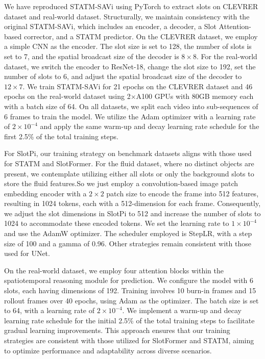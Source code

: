 \documentclass[sigconf]{acmart}
\begin{document}
We have reproduced STATM-SAVi using PyTorch to extract slots on CLEVRER dataset and real-world dataset. Structurally, we maintain consistency with the original STATM-SAVi, which includes an encoder, a decoder, a Slot Attention-based corrector, and a STATM predictor. On the CLEVRER dataset, we employ a simple CNN as the encoder. The slot size is set to 128, the number of slots is set to 7, and the spatial broadcast size of the decoder is $8\times8$. For the real-world dataset, we switch the encoder to ResNet-18, change the slot size to 192, set the number of slots to 6, and adjust the spatial broadcast size of the decoder to $12\times7$. We train STATM-SAVi for 21 epochs on the CLEVRER dataset and 46 epochs on the real-world dataset using 2$\times$A100 GPUs with 80GB memory each with a batch size of 64. On all datasets, we split each video into sub-sequences of 6 frames to train the model. We utilize the Adam optimizer with a learning rate of $2\times 10^{-4}$ and apply the same warm-up and decay learning rate schedule for the first 2.5\% of the total training steps.

For SlotPi, our training strategy on benchmark datasets aligns with those used for STATM and SlotFormer. For the fluid dataset, where no distinct objects are present, we contemplate utilizing either all slots or only the background slots to store the fluid features.So we just employ a convolution-based image patch embedding encoder with a $2\times2$ patch size to encode the frame into 512 features, resulting in 1024 tokens, each with a 512-dimension for each frame. Consequently, we adjust the slot dimensions in SlotPi to 512 and increase the number of slots to 1024 to accommodate these encoded tokens. We set the learning rate to $1\times 10^{-4}$ and use the AdamW optimizer. The scheduler employed is StepLR, with a step size of 100 and a gamma of 0.96. Other strategies remain consistent with those used for UNet.

On the real-world dataset, we employ four attention blocks within the spatiotemporal reasoning module for prediction. We configure the model with 6 slots, each having dimensions of 192. Training involves 10 burn-in frames and 15 rollout frames over 40 epochs, using Adam as the optimizer. The batch size is set to 64, with a learning rate of $2\times 10^{-4}$. We implement a warm-up and decay learning rate schedule for the initial 2.5\% of the total training steps to facilitate gradual learning improvements. This approach ensures that our training strategies are consistent with those utilized for SlotFormer and STATM, aiming to optimize performance and adaptability across diverse scenarios.
\end{document}
